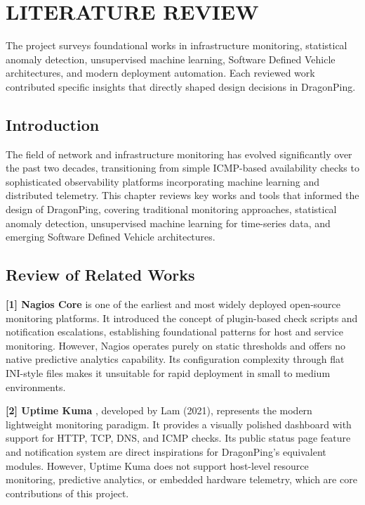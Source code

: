 \documentclass[12pt,a4paper,oneside]{report}
\begin{document}
\chapter{LITERATURE REVIEW}

The project surveys foundational works in infrastructure monitoring, statistical anomaly detection, unsupervised machine learning, Software Defined Vehicle architectures, and modern deployment automation. Each reviewed work contributed specific insights that directly shaped design decisions in DragonPing.

\section{Introduction}
\noindent The field of network and infrastructure monitoring has evolved significantly over the past two decades, transitioning from simple ICMP-based availability checks to sophisticated observability platforms incorporating machine learning and distributed telemetry. This chapter reviews key works and tools that informed the design of DragonPing, covering traditional monitoring approaches, statistical anomaly detection, unsupervised machine learning for time-series data, and emerging Software Defined Vehicle architectures.

\section{Review of Related Works}

\noindent \textbf{[1] Nagios Core} \cite{nagios} is one of the earliest and most widely deployed open-source monitoring platforms. It introduced the concept of plugin-based check scripts and notification escalations, establishing foundational patterns for host and service monitoring. However, Nagios operates purely on static thresholds and offers no native predictive analytics capability. Its configuration complexity through flat INI-style files makes it unsuitable for rapid deployment in small to medium environments.

\noindent \textbf{[2] Uptime Kuma} \cite{uptime_kuma}, developed by Lam (2021), represents the modern lightweight monitoring paradigm. It provides a visually polished dashboard with support for HTTP, TCP, DNS, and ICMP checks. Its public status page feature and notification system are direct inspirations for DragonPing's equivalent modules. However, Uptime Kuma does not support host-level resource monitoring, predictive analytics, or embedded hardware telemetry, which are core contributions of this project.
\end{document}

